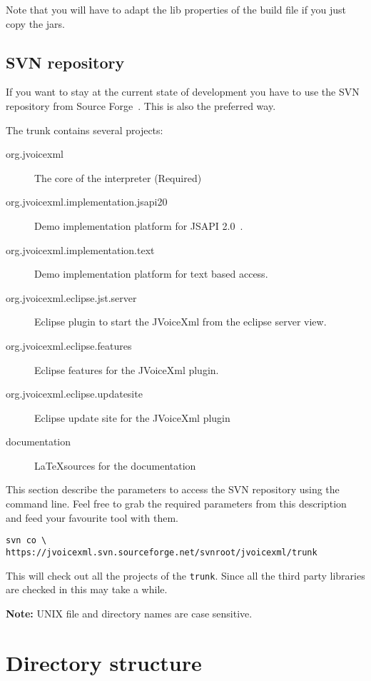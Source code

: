 \documentclass[11pt,a4paper]{article}
\begin{document}
Note that you will have to adapt the lib properties of the build file
if you just copy the jars.

\subsection{SVN repository}
\label{sec:cvs-repository}

If you want to stay at the current state of development you have to use
the SVN repository from Source Forge~\cite{sourceforge}.
This is also the preferred way.

The trunk contains several projects:
\begin{description}
\item[org.jvoicexml] The core of the interpreter (Required)
\item[org.jvoicexml.implementation.jsapi20] Demo implementation platform for
JSAPI 2.0~\cite{jcp:jsr113}.
\item[org.jvoicexml.implementation.text] Demo implementation platform for
text based access.
\item[org.jvoicexml.eclipse.jst.server] Eclipse plugin to start the JVoiceXml
from the eclipse server view.
\item[org.jvoicexml.eclipse.features] Eclipse features for the JVoiceXml
plugin.
\item[org.jvoicexml.eclipse.updatesite] Eclipse update site for the
JVoiceXml plugin
\item[documentation] \LaTeX sources for the documentation
\end{description}

This section describe the parameters to access the SVN repository 
using the command line. Feel free to grab the required parameters from
this description and feed your favourite tool with them.

\begin{lstlisting}
svn co \
https://jvoicexml.svn.sourceforge.net/svnroot/jvoicexml/trunk
\end{lstlisting}

This will check out all the projects of the \texttt{trunk}.
Since all the third party libraries are checked in this may
take a while.

\textbf{Note:} UNIX file and directory names are case sensitive.

\section{Directory structure}
\label{sec:directory-structure}
\end{document}
